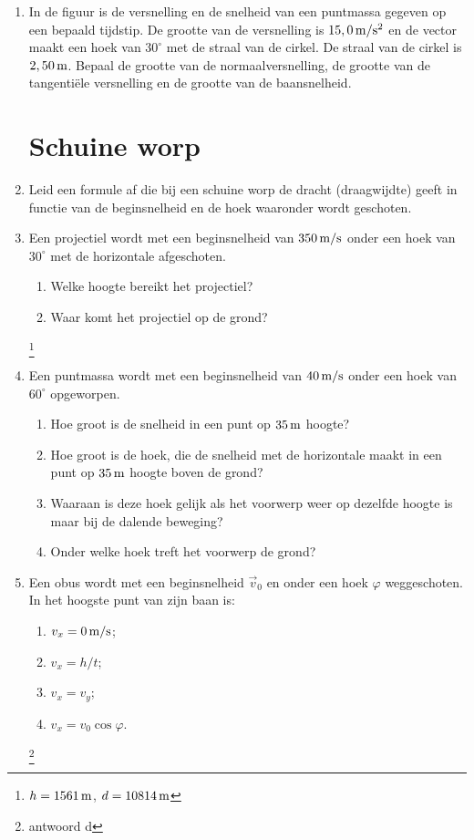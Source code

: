\begin{enumerate}
\item In de figuur is de versnelling en de snelheid van een puntmassa gegeven op een bepaald tijdstip. De grootte van de versnelling is $15,0\rm\,m/s^2$ en de vector maakt een hoek van $30^\circ$ met de straal van de cirkel. De straal van de cirkel is $2,50\rm\,m$. Bepaal de grootte van de normaalversnelling, de grootte van de tangenti\"ele versnelling en de grootte van de baansnelheid.




\cleardoublepage

\section{Schuine worp}

\item Leid een formule af die bij een schuine worp de dracht
(draagwijdte) geeft in functie van de beginsnelheid en de hoek
waaronder wordt geschoten.

\item Een projectiel wordt met een beginsnelheid van $350\rm\,m/s$
onder een hoek van $30^\circ$ met de horizontale afgeschoten.
\begin{enumerate}
\item Welke hoogte bereikt het projectiel?
\item Waar komt het projectiel op de grond?
\end{enumerate}
\footnote{$h=1561\rm\,m$, $d=10814\rm\,m$}

\item Een puntmassa wordt met een beginsnelheid van $40\rm\,m/s$
onder een hoek van $60^{\circ}$ opgeworpen.
\begin{enumerate}
\item Hoe groot is de snelheid in een punt op $35\rm\,m$ hoogte?
\item Hoe groot is de hoek, die de snelheid met de horizontale maakt in een punt
op $35\rm\,m$ hoogte boven de grond?
\item Waaraan is deze hoek gelijk als het voorwerp weer op dezelfde
hoogte is maar bij de dalende beweging?
\item Onder welke hoek treft het voorwerp de grond?
\end{enumerate}

\item Een obus wordt met een beginsnelheid $\vec{v}_0$ en onder een
hoek $\varphi$ weggeschoten. In het hoogste punt van zijn baan is:
\begin{enumerate}
\item $v_x=0\rm\,m/s$;
\item $v_x=h/t$;
\item $v_x=v_y$;
\item $v_x=v_0\cos{\varphi}$.
\end{enumerate}
\footnote{antwoord d}


\end{enumerate}
